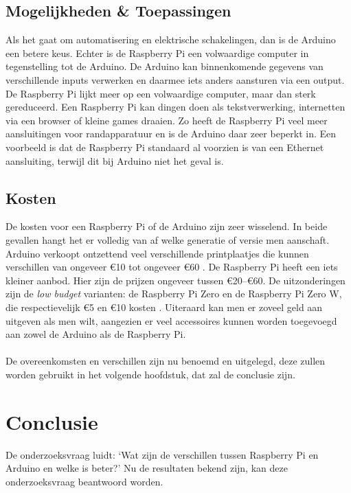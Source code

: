 \documentclass[a4paper, dutch, abstract=true]{scrartcl}
\begin{document}
\subsection{Mogelijkheden \& Toepassingen}
Als het gaat om automatisering en elektrische schakelingen, dan is de Arduino een betere keus.
Echter is de Raspberry Pi een volwaardige computer in tegenstelling tot de Arduino.
De Arduino kan binnenkomende gegevens van verschillende inputs verwerken en daarmee iets anders
aansturen via een output.
De Raspberry Pi lijkt meer op een volwaardige computer, maar dan sterk gereduceerd.
Een Raspberry Pi kan dingen doen als tekstverwerking, internetten via een browser of kleine games
draaien.
Zo heeft de Raspberry Pi veel meer aansluitingen voor randapparatuur en is de Arduino daar zeer
beperkt in.
Een voorbeeld is dat de Raspberry Pi standaard al voorzien is van een Ethernet aansluiting,
terwijl dit bij Arduino niet het geval is.

\subsection{Kosten}
De kosten voor een Raspberry Pi of de Arduino zijn zeer wisselend.
In beide gevallen hangt het er volledig van af welke generatie of versie men aanschaft.
Arduino verkoopt ontzettend veel verschillende printplaatjes die kunnen verschillen van ongeveer
\euro10 tot ongeveer \euro60 \cite{arduino2019arduino}.
De Raspberry Pi heeft een iets kleiner aanbod.
Hier zijn de prijzen ongeveer tussen \euro20--\euro60.
De uitzonderingen zijn de \emph{low budget} varianten: de Raspberry Pi Zero en de Raspberry Pi Zero W, die
respectievelijk \euro5 en \euro10 kosten \cite{kiwi2019zoeken}.
Uiteraard kan men er zoveel geld aan uitgeven als men wilt, aangezien er veel accessoires kunnen
worden toegevoegd aan zowel de Arduino als de Raspberry Pi.

\paragraph*{}
De overeenkomsten en verschillen zijn nu benoemd en uitgelegd, deze zullen worden gebruikt in het
volgende hoofdstuk, dat zal de conclusie zijn.

\section{Conclusie}
De onderzoeksvraag luidt: `Wat zijn de verschillen tussen Raspberry Pi en Arduino en welke is
beter?'
Nu de resultaten bekend zijn, kan deze onderzoeksvraag beantwoord worden.
\end{document}
